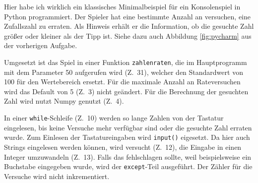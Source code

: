\documentclass[11pt,a4paper]{article}
\begin{document}
Hier habe ich wirklich ein klassisches Minimalbeispiel für ein Konsolenspiel in Python programmiert. Der Spieler hat eine bestimmte Anzahl an versuchen, eine Zufallszahl zu erraten. Als Hinweis erhält er die Information, ob die gesuchte Zahl größer oder kleiner als der Tipp ist. Siehe dazu auch Abbildung \ref{fig:pycharm} aus der vorherigen Aufgabe.

Umgesetzt ist das Spiel in einer Funktion \texttt{zahlenraten}, die im Hauptprogramm mit dem Parameter 50 aufgerufen wird (Z.~31), welcher den Standardwert von 100 für den Wertebereich ersetzt. Für die maximale Anzahl an Rateversuchen wird das Default von 5 (Z.~3) nicht geändert. Für die Berechnung der gesuchten Zahl wird nutzt Numpy genutzt (Z.~4).

\bigskip



In einer \texttt{while}-Schleife (Z.~10) werden so lange Zahlen von der Tastatur eingelesen, bis keine Versuche mehr verfügbar sind oder die gesuchte Zahl erraten wurde. Zum Einlesen der Tastatureingaben wird \texttt{input()} eigesetzt. Da hier auch Strings eingelesen werden können, wird versucht (Z.~12), die Eingabe in einen Integer umzuwandeln (Z.~13). Falls das fehlschlagen sollte, weil beispielsweise ein Buchstabe eingegeben wurde, wird der \texttt{except}-Teil ausgeführt. Der Zähler für die Versuche wird nicht inkrementiert.
\end{document}
